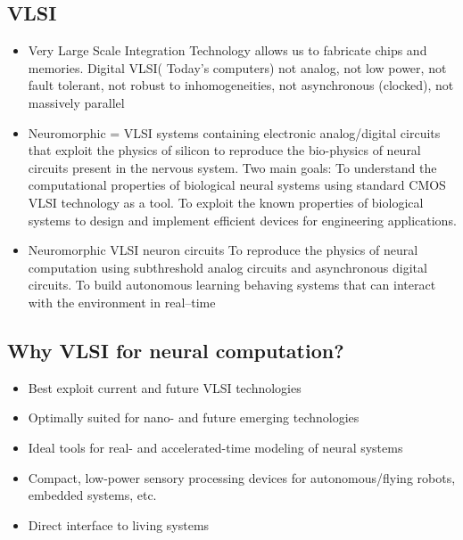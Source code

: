 \documentclass[english,11pt]{article}
\begin{document}
\subsection{VLSI}
\begin{itemize}
\item Very Large Scale Integration Technology allows us to fabricate chips and memories. Digital VLSI( Today's computers) not analog, not low power, not fault tolerant, not robust to inhomogeneities, not asynchronous (clocked), not massively parallel
\item Neuromorphic = VLSI systems containing electronic analog/digital circuits that exploit the physics of silicon to reproduce the bio-physics of neural circuits present in the nervous system. Two main goals:
\subitem To understand the computational properties of biological neural systems using standard CMOS VLSI technology as a tool.
\subitem To exploit the known properties of biological systems to design and implement efficient devices for engineering applications.
\item Neuromorphic VLSI neuron circuits
\subitem To reproduce the physics of neural computation using subthreshold analog circuits and asynchronous digital circuits.
\subitem To build autonomous learning behaving systems that can interact with the environment in real–time
\end{itemize}

\subsection{Why VLSI for neural computation?}
\begin{itemize}
\item Best exploit current and future VLSI technologies
\item Optimally suited for nano- and future emerging technologies
\item Ideal tools for real- and accelerated-time modeling of neural systems
\item Compact, low-power sensory processing devices for autonomous/flying robots, embedded systems, etc.
\item Direct interface to living systems
\end{itemize}
\end{document}
